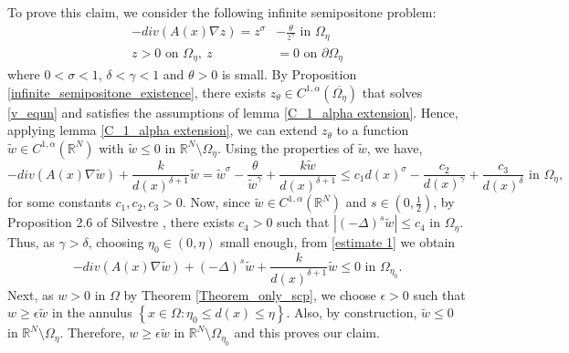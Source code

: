 \documentclass[reqno,oneside]{amsart}
\theoremstyle{definition}
\theoremstyle{remark}
\numberwithin{equation}{section}
\newcommand{\Om} {\Omega}
\newcommand{\sr}{\mathbb{R}}
\newcommand{\s}{(-\Delta)^s}
\newcommand{\pa}{\partial}
\newcommand{\na} {\nabla}
\newcommand{\si}{\sigma}
\begin{document}
To prove this claim, we consider the following infinite semipositone problem:
\begin{equation}\label{v_equn}
    \begin{aligned}
        -div \left(A (x) \na z \right) = z^{\si} &- \frac{\theta}{z^{\gamma}} \text{ in } \Om_{\eta}\\
        z > 0\text{ on } \Om_\eta,\ z &= 0 \text{ on } \pa\Om_{\eta}
    \end{aligned}
\end{equation}
where $0< \si <1$, $\delta < \gamma <1$ and $\theta>0$ is small.
By Proposition \ref{infinite_semipositone_existence}, there exists 
\( z_\theta \in C^{1,\alpha}(\overline{\Omega_\eta}) \) that solves \eqref{v_equn} and satisfies the assumptions of lemma \ref{C_1_alpha extension}.
Hence, applying lemma \ref{C_1_alpha extension}, we can extend \( z_\theta \) to a function \( \tilde{w} \in C^{1,\alpha}(\mathbb{R}^N) \) with $\tilde{w}\leq 0$ in $\mathbb{R}^N\setminus \Om_\eta$. Using the properties of $\tilde{w}$, we have,
\begin{equation}\label{estimate 1}
    -div \left(A(x) \na \tilde{w} \right) + \frac{k}{d(x)^{\delta +1}} \tilde{w} = \tilde{w}^{\si} - \frac{\theta}{\tilde{w}^{\gamma}} + \frac{k \tilde{w}}{d(x)^{\delta +1}} \leq c_1 d(x)^{\si} - \frac{c_2}{d(x)^{\gamma}} + \frac{c_3}{d(x)^{\delta}} \text{ in } \Om_{\eta},
\end{equation}
for some constants $c_1, c_2, c_3 >0$. Now, since $\tilde{w} \in C^{1, \alpha} (\sr^N)$ and $s\in \left( 0, \frac{1}{2} \right) $, by Proposition 2.6 of Silvestre \cite{silvestre2007regularity}, there exists $c_4 >0$ such that $\left|\s \tilde{w}\right| \leq c_4$ in $\Om_{\eta}$. Thus, as $\gamma >\delta$, choosing $\eta_0 \in (0, \eta )$ small enough, from \eqref{estimate 1} we obtain
\begin{equation}\label{v_tilde equn}
    -div \left(A(x) \na \tilde{w} \right) + \s \tilde{w} + \frac{k}{d(x)^{\delta +1}} \tilde{w} \leq 0 \text{ in } \Om_{\eta_0}.
\end{equation}
Next, as $w>0$ in $\Om$ by Theorem \ref{Theorem_only_scp}, we choose $\epsilon >0$ such that $w \geq \epsilon \tilde{w}$ in the annulus $\left\{x\in \Om: \eta_0 \leq d(x) \leq \eta \right\}.$ Also, by construction, $\tilde{w}\leq 0$ in $\sr^N \setminus \Om_\eta$. Therefore, $w \geq \epsilon \tilde{w}$ in $\sr^N \setminus \Om_{\eta_0}$ and this proves our claim.
\end{document}
